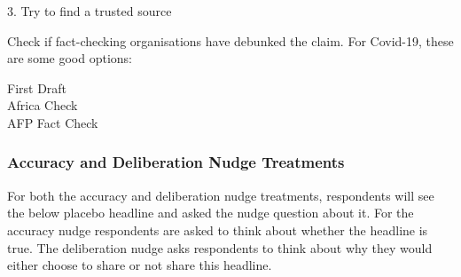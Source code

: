 \documentclass[letterpaper, 12pt, parskip=full,DIV=10]{scrartcl}
\begin{document}
3. Try to find a trusted source

Check if fact-checking organisations have debunked the claim. For Covid-19, these are some good options:

First Draft\\
Africa Check\\
AFP Fact Check

%
%


\subsubsection{Accuracy and Deliberation Nudge Treatments}\label{sec:nudge}

For both the accuracy and deliberation nudge treatments, respondents will see the below placebo headline and asked the nudge question about it. For the accuracy nudge respondents are asked to think about whether the headline is true. The deliberation nudge asks respondents to think about why they would either choose to share or not share this headline.
\end{document}

